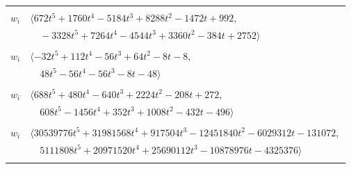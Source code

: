 \documentclass[11pt]{article}
\begin{document}
\begin{longtable}{@{}ll@{}}
\addlinespace[2pt]
\multicolumn{2}{@{}p{0.97\textwidth}@{}}{$i=10$, $D_i=32$, $\rho_{ij}$: $9{:}2, \allowbreak 13{:}2, \allowbreak 15{:}1, \allowbreak 16{:}1, \allowbreak 18{:}2, \allowbreak 25{:}2, \allowbreak 26{:}1, \allowbreak 31{:}1, \allowbreak 35{:}1, \allowbreak 38{:}1, \allowbreak 43{:}1, \allowbreak 48{:}2, \allowbreak 49{:}2, \allowbreak 51{:}1, \allowbreak 58{:}2$}\\
$w_i$ & $\langle 672t^{5}+1760t^{4}-5184t^{3}+8288t^{2}-1472t+992,$\\
 & $\quad -3328t^{5}+7264t^{4}-4544t^{3}+3360t^{2}-384t+2752\rangle$\\
\addlinespace[2pt]
\multicolumn{2}{@{}p{0.97\textwidth}@{}}{$i=11$, $D_i=8$, $\rho_{ij}$: $0{:}2, \allowbreak 8{:}1, \allowbreak 9{:}1, \allowbreak 17{:}2, \allowbreak 19{:}1, \allowbreak 25{:}2, \allowbreak 33{:}2, \allowbreak 35{:}2, \allowbreak 49{:}1$}\\
$w_i$ & $\langle -32t^{5}+112t^{4}-56t^{3}+64t^{2}-8t-8,$\\
 & $\quad 48t^{5}-56t^{4}-56t^{3}-8t-48\rangle$\\
\addlinespace[2pt]
\multicolumn{2}{@{}p{0.97\textwidth}@{}}{$i=12$, $D_i=16$, $\rho_{ij}$: $0{:}2, \allowbreak 9{:}2, \allowbreak 15{:}1, \allowbreak 18{:}1, \allowbreak 20{:}1, \allowbreak 25{:}1, \allowbreak 27{:}1, \allowbreak 31{:}2, \allowbreak 32{:}2, \allowbreak 39{:}1, \allowbreak 43{:}2, \allowbreak 44{:}1, \allowbreak 48{:}2, \allowbreak 49{:}2$}\\
$w_i$ & $\langle 688t^{5}+480t^{4}-640t^{3}+2224t^{2}-208t+272,$\\
 & $\quad 608t^{5}-1456t^{4}+352t^{3}+1008t^{2}-432t-496\rangle$\\
\addlinespace[2pt]
\multicolumn{2}{@{}p{0.97\textwidth}@{}}{$i=13$, $D_i=131072$, $\rho_{ij}$: $0{:}2, \allowbreak 10{:}1, \allowbreak 14{:}1, \allowbreak 19{:}2, \allowbreak 23{:}2, \allowbreak 28{:}2, \allowbreak 29{:}2, \allowbreak 33{:}1, \allowbreak 34{:}2, \allowbreak 35{:}1, \allowbreak 37{:}1, \allowbreak 55{:}1$}\\
$w_i$ & $\langle 30539776t^{5}+31981568t^{4}+917504t^{3}-12451840t^{2}-6029312t-131072,$\\
 & $\quad 5111808t^{5}+20971520t^{4}+25690112t^{3}-10878976t-4325376\rangle$\\
\addlinespace[2pt]
\multicolumn{2}{@{}p{0.97\textwidth}@{}}{$i=14$, $D_i=4096$, $\rho_{ij}$: $0{:}2, \allowbreak 13{:}2, \allowbreak 15{:}2, \allowbreak 18{:}2, \allowbreak 34{:}2, \allowbreak 38{:}2$}\\

\end{longtable}
\end{document}
